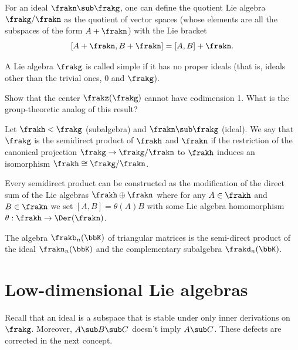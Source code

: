 \begin{defn}
    For an ideal $\frakn\sub\frakg$, one can define the quotient Lie algebra $\frakg\slash \frakn$ as the quotient of vector spaces (whose elements are all the subspaces of the form $A+\frakn$) with the Lie bracket
    \[[A+\frakn,B+\frakn]=[A,B]+\frakn.\]
\end{defn}

\begin{defn}
    A Lie algebra $\frakg$ is called simple if it has no proper ideals (that is, ideals other than the trivial ones, $0$ and $\frakg$).
\end{defn}


\begin{xca}
    Show that the center $\frakz(\frakg)$ cannot have codimension 1. What is the group-theoretic analog of this result?
\end{xca}


\begin{defn}
    Let $\frakh<\frakg$ (subalgebra) and $\frakn\sub \frakg$ (ideal). We say that $\frakg$ is the semidirect product of $\frakh$ and $\frakn$ if the restriction of the canonical projection $\frakg\to \frakg\slash\frakn$ to $\frakh$ induces an isomorphism $\frakh\cong \frakg\slash\frakn$.

    Every semidirect product can be constructed as the modification of the direct sum of the Lie algebras $\frakh\oplus\frakn$ where for any $A\in \frakh$ and $B\in\frakn$ we set $[A,B]=\theta(A)B$ with some Lie algebra homomorphism $\theta:\frakh\to \Der(\frakn)$.
\end{defn}

\begin{example}
    The algebra $\frakb_n(\bbK)$ of triangular matrices is the semi-direct product of the ideal $\frakn_n(\bbK)$ and the complementary subalgebra $\frakd_n(\bbK)$.
\end{example}





\section{Low-dimensional Lie algebras}\label{sec: low-dim lie algebras}

Recall that an ideal is a subspace that is stable under only inner derivations on $\frakg$. Moreover, $A\sub B\sub C$ doesn't imply $A\sub C$. These defects are corrected in the next concept.

